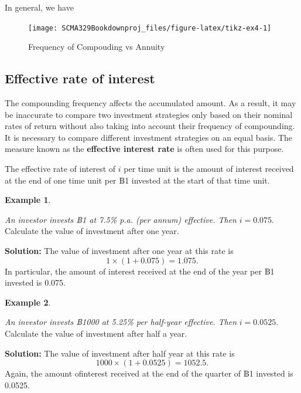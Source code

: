 \documentclass[
]{book}
\theoremstyle{definition}
\theoremstyle{definition}
\newtheorem{example}{Example}[chapter]
\theoremstyle{definition}
\theoremstyle{definition}
\theoremstyle{remark}
\begin{document}
In general, we have

\begin{figure}

{\centering \texttt{[image: SCMA329Bookdownproj\_files/figure-latex/tikz-ex4-1]} 

}

\caption{Frequency of Compouding vs Annuity}\label{fig:tikz-ex4}
\end{figure}

\hypertarget{effective-rate-of-interest}{%
\subsection{Effective rate of interest}\label{effective-rate-of-interest}}

The compounding frequency affects the accumulated amount. As a result, it may be inaccurate to compare two investment strategies only based on their nominal rates of return without also taking into account their frequency of compounding. It is necessary to compare different investment strategies on an equal basis. The measure known as the \textbf{effective interest rate} is often used for this purpose.

The effective rate of interest of \(i\) per time unit is the amount of
interest received at the end of one time unit per ฿1 invested at the
start of that time unit.

\begin{example}
\protect\hypertarget{exm:unlabeled-div-8}{}\label{exm:unlabeled-div-8}

\emph{An investor invests ฿1 at 7.5\% p.a. (per annum) effective. Then}
\(i = 0.075\). Calculate the value of investment after one year.

\end{example}

\textbf{Solution:} The value of investment after one year at this rate is
\[1 \times ( 1 + 0.075) = 1.075.\]
In particular, the amount of
interest received at the end of the year per ฿1 invested is 0.075.

\begin{example}
\protect\hypertarget{exm:unlabeled-div-9}{}\label{exm:unlabeled-div-9}

\emph{An investor invests ฿1000 at 5.25\% per half-year effective. Then}
\(i = 0.0525\). Calculate the value of investment after half a year.

\end{example}

\textbf{Solution:} The value of investment after half year at this rate is
\[1000 \times ( 1 + 0.0525) = 1052.5.\]
Again, the amount ofinterest received at the end of the quarter of ฿1 invested is 0.0525.
\end{document}
